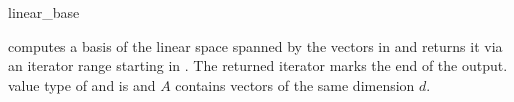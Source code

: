 \begin{ccRefFunction}{linear_base}
\ccHtmlNoLinks

{computes a basis of the linear space spanned by the vectors 
in \ccc{A = tuple [first,last)} and returns it via an iterator 
range starting in . The returned iterator marks the 
end of the output.
\ccPrecond value type of  and  
is  and $A$ contains vectors of the same dimension $d$.}

\end{ccRefFunction}

